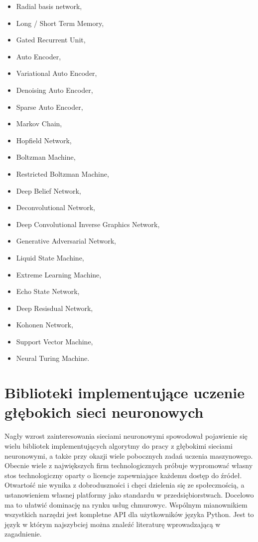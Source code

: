 \documentclass[12pt,a4paper,twoside,titlepage,openright]{book}
\begin{document}
\begin{itemize}
\begin{itemize}
\item Radial basis network,
\item Long / Short Term Memory,
\item Gated Recurrent Unit,
\item Auto Encoder,
\item Variational Auto Encoder,
\item Denoising Auto Encoder,
\item Sparse Auto Encoder,
\item Markov Chain,
\item Hopfield Network,
\item Boltzman Machine,
\item Restricted Boltzman Machine,
\item Deep Belief Network,
\item Deconvolutional Network,
\item Deep Convolutional Inverse Graphics Network,
\item Generative Adversarial Network,
\item Liquid State Machine,
\item Extreme Learning Machine,
\item Echo State Network,
\item Deep Resisdual Network,
\item Kohonen Network,
\item Support Vector Machine,
\item Neural Turing Machine.
\end{itemize}

\chapter{Biblioteki implementujące uczenie głębokich sieci neuronowych}
Nagły wzrost zainteresowania sieciami neuronowymi spowodował pojawienie się wielu bibliotek implementujących algorytmy do pracy z głębokimi sieciami neuronowymi, a także przy okazji wiele pobocznych zadań uczenia maszynowego. Obecnie wiele z największych firm technologicznych próbuje wypromować własny stos technologiczny oparty o licencje zapewniające każdemu dostęp do źródeł. Otwartość nie wynika z dobroduszności i chęci dzielenia się ze społecznością, a ustanowieniem własnej platformy jako standardu w przedsiębiorstwach. Docelowo ma to ułatwić dominację na rynku usług chmurowyc. Wspólnym mianownikiem wszystkich narzędzi jest kompletne API dla użytkowników języka Python. Jest to język w którym najszybciej można znaleźć literaturę wprowadzającą w zagadnienie. \cite{siteDLByLanguage}


\end{itemize}
\end{document}
